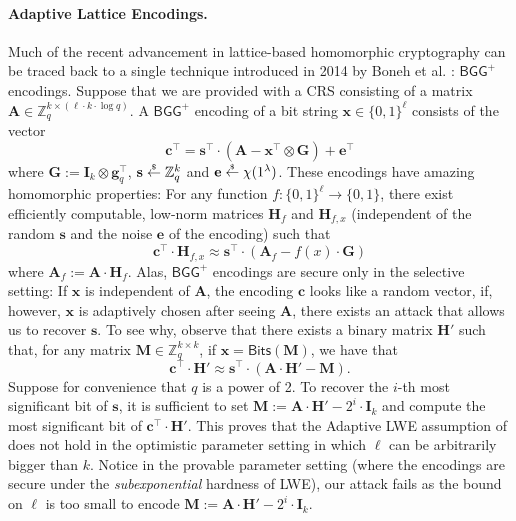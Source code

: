 \documentclass{theoretics}
\newcommand{\getsr}{\overset{\raisebox{-1pt}{$\scriptscriptstyle \$$}}{\gets}}
\newcommand{\sample}{\getsr}
\newcommand{\Z}{\mathbb{Z}}
\renewcommand{\sec}{\ensuremath{\lambda}}
\newcommand{\id}{\ensuremath{\mathbf{I}}}
\newcommand\bbbone{1}
\begin{document}
\paragraph{Adaptive Lattice Encodings.} Much of the recent advancement in lattice-based homomorphic cryptography can be traced back to a single technique introduced in 2014 by Boneh et al. \cite{EC:BGGHNS14}: $\mathsf{BGG^+}$ encodings. Suppose that we are provided with a CRS consisting of a matrix $\mathbf{A}\in\Z_q^{k\times (\ell\cdot k\cdot \log q)}$. A $\mathsf{BGG^+}$ encoding of a bit string $\mathbf{x}\in\{0, 1\}^\ell$ consists of the vector
\[\mathbf{c}^\intercal=\mathbf{s}^\intercal \cdot(\mathbf{A}-\mathbf{x}^\intercal\otimes \mathbf{G})+\mathbf{e}^\intercal\]
where $\mathbf{G}:=\id_k\otimes \mathbf{g}_q^\intercal$, $\mathbf{s}\sample\Z_q^k$ and $\mathbf{e}\sample\chi(\bbbone^\sec)$. These encodings have amazing homomorphic properties: For any function $f:\{0, 1\}^\ell\rightarrow\{0, 1\}$, there exist efficiently computable, low-norm matrices $\mathbf{H}_f$ and $\mathbf{H}_{f, x}$ (independent of the random $\mathbf{s}$ and the noise $\mathbf{e}$ of the encoding) such that
\[\mathbf{c}^\intercal\cdot \mathbf{H}_{f, x}\approx \mathbf{s}^\intercal \cdot (\mathbf{A}_f-f(x)\cdot \mathbf{G})\]
where $\mathbf{A}_f:=\mathbf{A}\cdot \mathbf{H}_f$. Alas, $\mathsf{BGG^+}$ encodings are secure only in the selective setting: If $\mathbf{x}$ is independent of $\mathbf{A}$, the encoding $\mathbf{c}$ looks like a random vector, if, however, $\mathbf{x}$ is adaptively chosen after seeing $\mathbf{A}$, there exists an attack that allows us to recover $\mathbf{s}$. To see why, observe that there exists a binary matrix $\mathbf{H}'$ such that, for any matrix $\mathbf{M}\in\Z_q^{k\times k}$, if $\mathbf{x}=\mathsf{Bits}(\mathbf{M})$, we have that
\[\mathbf{c}^\intercal\cdot \mathbf{H}'\approx \mathbf{s}^\intercal \cdot (\mathbf{A}\cdot \mathbf{H}'-\mathbf{M}).\]
Suppose for convenience that $q$ is a power of 2. To recover the $i$-th most significant bit of $\mathbf{s}$, it is sufficient to set $\mathbf{M}:=\mathbf{A}\cdot \mathbf{H}'- 2^i\cdot \id_k$ and compute the most significant bit of $\mathbf{c}^\intercal\cdot \mathbf{H}'$. This proves that the Adaptive LWE assumption of \cite{FOCS:QuaWeeWic18} does not hold in the optimistic parameter setting in which $\ell$ can be arbitrarily bigger than $k$. Notice in the provable parameter setting (where the encodings are secure under the \emph{subexponential} hardness of LWE), our attack fails as the bound on $\ell$ is too small to encode $\mathbf{M}:=\mathbf{A}\cdot \mathbf{H}'- 2^i\cdot \id_k$.
\end{document}
